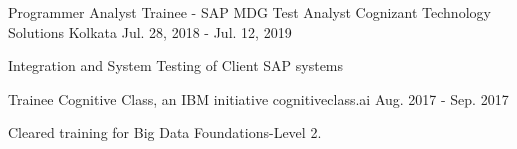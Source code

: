 


\begin{cventries}




\cventry
{Programmer Analyst Trainee - SAP MDG Test Analyst} %
{Cognizant Technology Solutions} %
{Kolkata} %
{Jul. 28, 2018 - Jul. 12, 2019} %
{ %
\begin{cvitems}
\item {Integration and System Testing of Client SAP systems}
\end{cvitems}
}


\cventry
{Trainee} %
{Cognitive Class, an IBM initiative} %
{cognitiveclass.ai} %
{Aug. 2017 - Sep. 2017} %
{ %
\begin{cvitems}
\item {Cleared training for Big Data Foundations-Level 2.}
\end{cvitems}
}




\end{cventries}